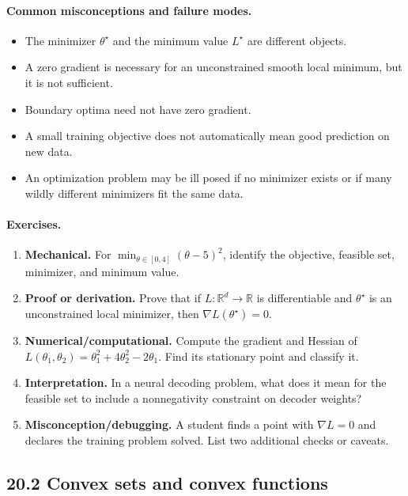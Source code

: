 \paragraph{Common misconceptions and failure modes.}
\begin{itemize}[leftmargin=*]
\item The minimizer \(\theta^\star\) and the minimum value \(L^\star\) are different objects.
\item A zero gradient is necessary for an unconstrained smooth local minimum, but it is not sufficient.
\item Boundary optima need not have zero gradient.
\item A small training objective does not automatically mean good prediction on new data.
\item An optimization problem may be ill posed if no minimizer exists or if many wildly different minimizers fit the same data.
\end{itemize}

\paragraph{Exercises.}
\begin{enumerate}[label=\textbf{20.1.\arabic*.}, leftmargin=*]
\item \textbf{Mechanical.} For \(\min_{\theta\in[0,4]}(\theta-5)^2\), identify the objective, feasible set, minimizer, and minimum value.
\item \textbf{Proof or derivation.} Prove that if \(L:\mathbb R^d\to\mathbb R\) is differentiable and \(\theta^\star\) is an unconstrained local minimizer, then \(\nabla L(\theta^\star)=0\).
\item \textbf{Numerical/computational.} Compute the gradient and Hessian of \(L(\theta_1,\theta_2)=\theta_1^2+4\theta_2^2-2\theta_1\). Find its stationary point and classify it.
\item \textbf{Interpretation.} In a neural decoding problem, what does it mean for the feasible set to include a nonnegativity constraint on decoder weights?
\item \textbf{Misconception/debugging.} A student finds a point with \(\nabla L=0\) and declares the training problem solved. List two additional checks or caveats.
\end{enumerate}

\subsection{20.2 Convex sets and convex functions}

